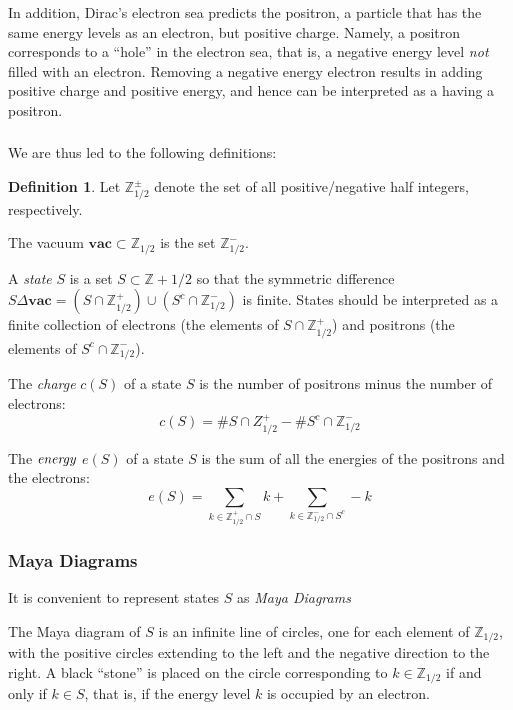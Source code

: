 \documentclass{amsart}[12pt]
\theoremstyle{definition}
\newtheorem{definition}[dummy]{Definition}
\newcommand{\Z}{\mathbb{Z}}
\newcommand{\vac}{\mathbf{vac}}
\begin{document}
In addition, Dirac's electron sea predicts the positron, a particle
that has the same energy levels as an electron, but positive charge.  Namely, a positron corresponds to a ``hole'' in the electron sea, that is, a negative
energy level \emph{not} filled with an electron.  Removing a negative energy electron results in adding positive charge and positive energy, and hence can be interpreted as a having a positron.

\subsubsection{} We are thus led to the following definitions:

\begin{definition} Let $\Z_{1/2}^\pm$ denote the set of all positive/negative half integers, respectively.

The vacuum $\vac\subset \Z_{1/2}$ is the set $\Z_{1/2}^-$.

A \emph{state} $S$ is a set $S\subset\Z+1/2$ so that the symmetric
difference $S\Delta \vac=(S\cap\Z_{1/2}^+)\cup (S^c\cap\Z_{1/2}^-)$ is finite.  States should be interpreted as a finite collection of electrons (the elements of $S\cap \Z^+_{1/2}$) and positrons (the elements of $S^c\cap \Z^-_{1/2}$).

The \emph{charge} $c(S)$ of a state $S$ is the number of positrons minus the number of electrons:
$$c(S)=\# S\cap Z^+_{1/2} - \# S^c\cap \Z^-_{1/2}$$

The $\emph{energy}$ $e(S)$ of a state $S$ is the sum of all the energies of the positrons and the electrons:
$$e(S)=\sum_{k\in\Z^+_{1/2}\cap S} k +\sum_{k\in\Z^-_{1/2}\cap S^c} -k$$

\end{definition}

\subsubsection{Maya Diagrams}

It is convenient to represent states $S$ as
\emph{Maya Diagrams}

The Maya diagram of $S$ is an infinite line of circles,
one for each element of $\Z_{1/2}$, with the positive circles extending to the left and
the negative direction to the right.  A black ``stone'' is placed on the
circle corresponding to $k\in\Z_{1/2}$ if and only if $k\in S$, that is, if the energy level $k$ is occupied by an electron.
\end{document}
